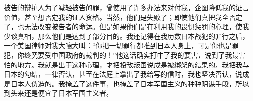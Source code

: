 被告的辩护人为了减轻被告的罪，曾使用了许多办法来对付我，企图降低我的证言价值，甚至想否定我的证人资格。当然，他们是失败了；即使他们真把我全否定了，也无法改变被告者的命运。但是如果他们是在利用我的畏惧惩罚的心理，使我少谈真相，那么他们是达到了部分目的。我还记得在我历数日本战犯的罪行之后，一个美国律师对我大嚷大叫：“你把一切罪行都推到日本人身上，可是你也是罪犯，你终究要受中国政府的裁判的！”他这话确实打中了我的要害，说到了我最害怕的地方。我就是出于这种心理，才把投敌叛国说成是被绑架的结果的。我把我与日本的勾结，一律否认，甚至在法庭上拿出了我给写的信时，我也坚决否认，说成是日本人伪造的。我掩盖了这件事，也掩盖了日本军国主义的种种阴谋手段，所以到头来还是便宜了日本军国主义者。
